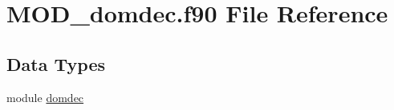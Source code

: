 \hypertarget{MOD__domdec_8f90}{\section{M\-O\-D\-\_\-domdec.\-f90 File Reference}
\label{MOD__domdec_8f90}
}
\subsection*{Data Types}
\begin{DoxyCompactItemize}
\item 
module \hyperlink{classdomdec}{domdec}
\end{DoxyCompactItemize}
